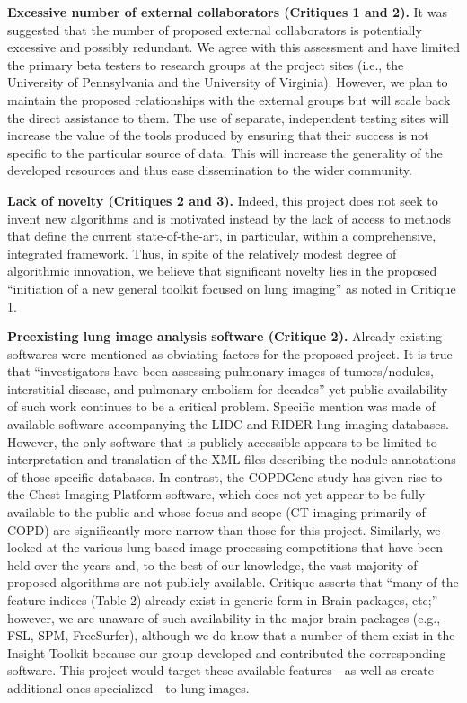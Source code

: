 \documentclass[11pt,]{article}
\begin{document}
\textbf{Excessive number of external collaborators (Critiques 1 and 2).}
It was suggested that the number of proposed external collaborators is
potentially excessive and possibly redundant. We agree with this
assessment and have limited the primary beta testers to research groups
at the project sites (i.e., the University of Pennsylvania and the
University of Virginia). However, we plan to maintain the proposed
relationships with the external groups but will scale back the direct
assistance to them. The use of separate, independent testing sites will
increase the value of the tools produced by ensuring that their success
is not specific to the particular source of data. This will increase the
generality of the developed resources and thus ease dissemination to the
wider community.

\textbf{Lack of novelty (Critiques 2 and 3).} Indeed, this project does
not seek to invent new algorithms and is motivated instead by the lack
of access to methods that define the current state-of-the-art, in
particular, within a comprehensive, integrated framework. Thus, in spite
of the relatively modest degree of algorithmic innovation, we believe
that significant novelty lies in the proposed ``initiation of a new
general toolkit focused on lung imaging'' as noted in Critique 1.

\textbf{Preexisting lung image analysis software (Critique 2).} Already
existing softwares were mentioned as obviating factors for the proposed
project. It is true that ``investigators have been assessing pulmonary
images of tumors/nodules, interstitial disease, and pulmonary embolism
for decades'' yet public availability of such work continues to be a
critical problem. Specific mention was made of available software
accompanying the LIDC and RIDER lung imaging databases. However, the
only software that is publicly accessible appears to be limited to
interpretation and translation of the XML files describing the nodule
annotations of those specific databases. In contrast, the COPDGene study
has given rise to the Chest Imaging Platform software, which does not
yet appear to be fully available to the public and whose focus and scope
(CT imaging primarily of COPD) are significantly more narrow than those
for this project. Similarly, we looked at the various lung-based image
processing competitions that have been held over the years and, to the
best of our knowledge, the vast majority of proposed algorithms are not
publicly available. Critique asserts that ``many of the feature indices
(Table 2) already exist in generic form in Brain packages, etc;''
however, we are unaware of such availability in the major brain packages
(e.g., FSL, SPM, FreeSurfer), although we do know that a number of them
exist in the Insight Toolkit because our group developed and contributed
the corresponding software. This project would target these available
features---as well as create additional ones specialized---to lung
images.
\end{document}
